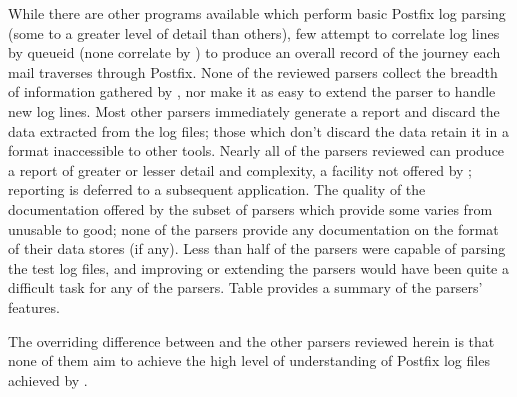 While there are other programs available which perform basic Postfix log
parsing (some to a greater level of detail than others), few attempt to
correlate log lines by queueid (none correlate by \pid{}) to produce an
overall record of the journey each mail traverses through Postfix.  None of
the reviewed parsers collect the breadth of information gathered by
\parsername{}, nor make it as easy to extend the parser to handle new log
lines.  Most other parsers immediately generate a report and discard the
data extracted from the log files; those which don't discard the data
retain it in a format inaccessible to other tools.  Nearly all of the
parsers reviewed can produce a report of greater or lesser detail and
complexity, a facility not offered by \parsername{}; reporting is deferred
to a subsequent application.  The quality of the documentation offered by
the subset of parsers which provide some varies from unusable to good; none
of the parsers provide any documentation on the format of their data stores
(if any).  Less than half of the parsers were capable of parsing the
\numberOFlogFILES{} test log files, and improving or extending the parsers
would have been quite a difficult task for any of the parsers.  Table
 provides a summary of the
parsers' features.

The overriding difference between \parsername{} and the other parsers
reviewed herein is that none of them aim to achieve the high level of
understanding of Postfix log files achieved by \parsername{}.
